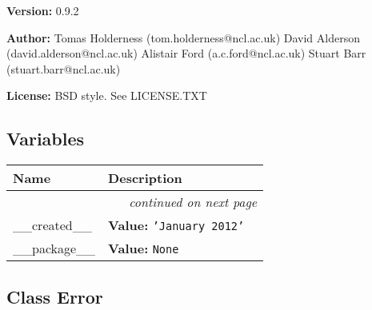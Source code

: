 \textbf{Version:} 0.9.2



\textbf{Author:} Tomas Holderness (tom.holderness@ncl.ac.uk)
David Alderson (david.alderson@ncl.ac.uk)
Alistair Ford (a.c.ford@ncl.ac.uk)
Stuart Barr (stuart.barr@ncl.ac.uk)



\textbf{License:} BSD style. See LICENSE.TXT





  \subsection{Variables}

    \vspace{-1cm}
\hspace{\varindent}\begin{longtable}{|p{\varnamewidth}|p{\vardescrwidth}|l}
\cline{1-2}
\cline{1-2} \centering \textbf{Name} & \centering \textbf{Description}& \\
\cline{1-2}
\endhead\cline{1-2}\multicolumn{3}{r}{\small\textit{continued on next page}}\\\endfoot\cline{1-2}
\endlastfoot\raggedright \_\-\_\-c\-r\-e\-a\-t\-e\-d\-\_\-\_\- & \raggedright \textbf{Value:} 
{\tt \texttt{'}\texttt{January 2012}\texttt{'}}&\\
\cline{1-2}
\raggedright \_\-\_\-p\-a\-c\-k\-a\-g\-e\-\_\-\_\- & \raggedright \textbf{Value:} 
{\tt None}&\\
\cline{1-2}
\end{longtable}



\subsection{Class Error}

